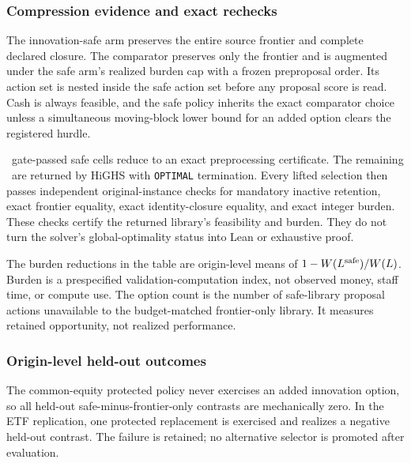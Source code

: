 \subsubsection{Compression evidence and exact rechecks}

The innovation-safe arm preserves the entire source frontier and complete
declared closure. The comparator preserves only the frontier and is augmented
under the safe arm's realized burden cap with a frozen preproposal order. Its
action set is nested inside the safe action set before any proposal score is
read. Cash is always feasible, and the safe policy inherits the exact
comparator choice unless a simultaneous moving-block lower bound for an added
option clears the registered hurdle.

\AORPointInTimePreprocessingSolutions\ gate-passed safe cells reduce to an
exact preprocessing certificate. The remaining
\AORPointInTimeSolverSolutions\ are returned by HiGHS with
\texttt{OPTIMAL} termination. Every lifted selection then passes independent
original-instance checks for mandatory inactive retention, exact frontier
equality, exact identity-closure equality, and exact integer burden. These
checks certify the returned library's feasibility and burden. They do not turn
the solver's global-optimality status into Lean or exhaustive proof.



The burden reductions in the table are origin-level means of
\(1-W(L^{\rm safe})/W(L)\). Burden is a prespecified
validation-computation index, not observed money, staff time, or compute use.
The option count is the number of safe-library proposal actions unavailable to
the budget-matched frontier-only library. It measures retained opportunity,
not realized performance.

\subsubsection{Origin-level held-out outcomes}

The common-equity protected policy never exercises an added innovation option,
so all held-out safe-minus-frontier-only contrasts are mechanically zero. In
the ETF replication, one protected replacement is exercised and realizes a
negative held-out contrast. The failure is retained; no alternative selector
is promoted after evaluation.



